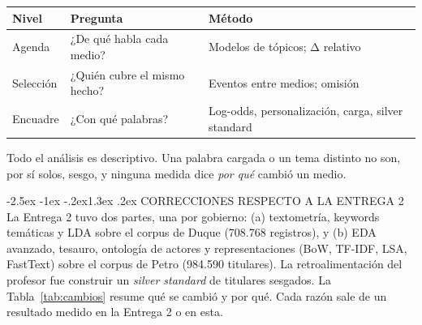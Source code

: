 \documentclass[10pt,twocolumn]{article}
\makeatletter
\renewcommand{\section}{\@startsection{section}{1}{\z@}%
  {-2.5ex \@plus -1ex \@minus -.2ex}{1.3ex \@plus .2ex}%
  {\normalfont\large\bfseries\centering}}
\makeatother
\begin{document}
\begin{center}\small\begin{tabular}{L{1.4cm}L{2.6cm}L{3.2cm}}\toprule
Nivel & Pregunta & Método\\\midrule
Agenda & ¿De qué habla cada medio? & Modelos de tópicos; Δ relativo\\
Selección & ¿Quién cubre el mismo hecho? & Eventos entre medios; omisión\\
Encuadre & ¿Con qué palabras? & Log-odds, personalización, carga, silver standard\\
\bottomrule\end{tabular}\end{center}

Todo el análisis es descriptivo. Una palabra cargada o un tema distinto no son,
por sí solos, sesgo, y ninguna medida dice \emph{por qué} cambió un medio.

\section{CORRECCIONES RESPECTO A LA ENTREGA 2}
La Entrega 2 tuvo dos partes, una por gobierno: (a) textometría, keywords
temáticas y LDA sobre el corpus de Duque (708.768 registros), y (b) EDA avanzado,
tesauro, ontología de actores y representaciones (BoW, TF-IDF, LSA, FastText)
sobre el corpus de Petro (984.590 titulares). La retroalimentación del profesor
fue construir un \emph{silver standard} de titulares sesgados. La
Tabla~\ref{tab:cambios} resume qué se cambió y por qué. Cada razón sale de un
resultado medido en la Entrega 2 o en esta.
\end{document}

